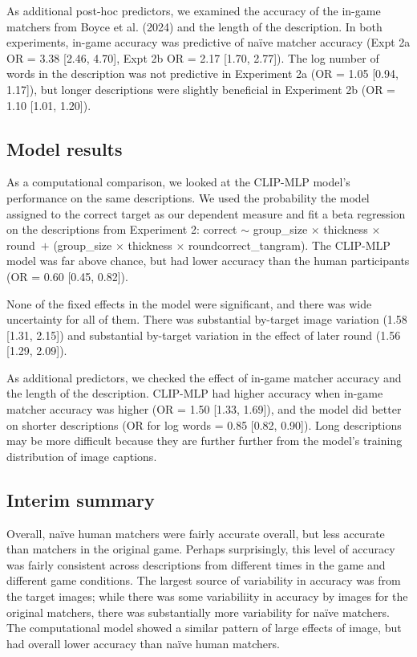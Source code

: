 \documentclass[10pt, letterpaper]{article}
\begin{document}
As additional post-hoc predictors, we examined the accuracy of the
in-game matchers from Boyce et al. (2024) and the length of the
description. In both experiments, in-game accuracy was predictive of
naïve matcher accuracy (Expt 2a OR = 3.38 {[}2.46, 4.70{]}, Expt 2b OR =
2.17 {[}1.70, 2.77{]}). The log number of words in the description was
not predictive in Experiment 2a (OR = 1.05 {[}0.94, 1.17{]}), but longer
descriptions were slightly beneficial in Experiment 2b (OR = 1.10
{[}1.01, 1.20{]}).

\subsection{Model results}\label{model-results}

As a computational comparison, we looked at the CLIP-MLP model's
performance on the same descriptions. We used the probability the model
assigned to the correct target as our dependent measure and fit a beta
regression on the descriptions from Experiment 2: correct \({\sim}\)
group\_size \({\times}\) thickness \({\times}\) round~\({+}\)
(group\_size \({\times}\) thickness \({\times}\)
round\textbar correct\_tangram). The CLIP-MLP model was far above
chance, but had lower accuracy than the human participants (OR = 0.60
{[}0.45, 0.82{]}).

None of the fixed effects in the model were significant, and there was
wide uncertainty for all of them. There was substantial by-target image
variation (1.58 {[}1.31, 2.15{]}) and substantial by-target variation in
the effect of later round (1.56 {[}1.29, 2.09{]}).

As additional predictors, we checked the effect of in-game matcher
accuracy and the length of the description. CLIP-MLP had higher accuracy
when in-game matcher accuracy was higher (OR = 1.50 {[}1.33, 1.69{]}),
and the model did better on shorter descriptions (OR for log words =
0.85 {[}0.82, 0.90{]}). Long descriptions may be more difficult because
they are further further from the model's training distribution of image
captions.

\subsection{Interim summary}\label{interim-summary}

Overall, naïve human matchers were fairly accurate overall, but less
accurate than matchers in the original game. Perhaps surprisingly, this
level of accuracy was fairly consistent across descriptions from
different times in the game and different game conditions. The largest
source of variability in accuracy was from the target images; while
there was some variabiliity in accuracy by images for the original
matchers, there was substantially more variability for naïve matchers.
The computational model showed a similar pattern of large effects of
image, but had overall lower accuracy than naïve human matchers.
\end{document}
